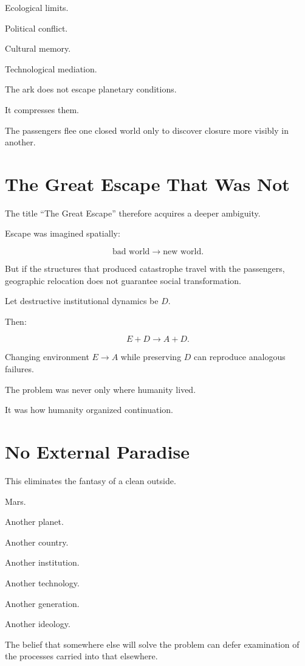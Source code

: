 \documentclass[11pt,oneside]{book}
\theoremstyle{definition}
\theoremstyle{remark}
\begin{document}
Ecological limits.

Political conflict.

Cultural memory.

Technological mediation.

The ark does not escape planetary conditions.

It compresses them.

The passengers flee one closed world only to discover closure more visibly in another.

\section{The Great Escape That Was Not}

The title ``The Great Escape'' therefore acquires a deeper ambiguity.

Escape was imagined spatially:

\[
\text{bad world}
\rightarrow
\text{new world}.
\]

But if the structures that produced catastrophe travel with the passengers, geographic relocation does not guarantee social transformation.

Let destructive institutional dynamics be \(D\).

Then:

\[
E+D
\rightarrow
A+D.
\]

Changing environment \(E\rightarrow A\) while preserving \(D\) can reproduce analogous failures.

The problem was never only where humanity lived.

It was how humanity organized continuation.

\section{No External Paradise}

This eliminates the fantasy of a clean outside.

Mars.

Another planet.

Another country.

Another institution.

Another technology.

Another generation.

Another ideology.

The belief that somewhere else will solve the problem can defer examination of the processes carried into that elsewhere.
\end{document}
